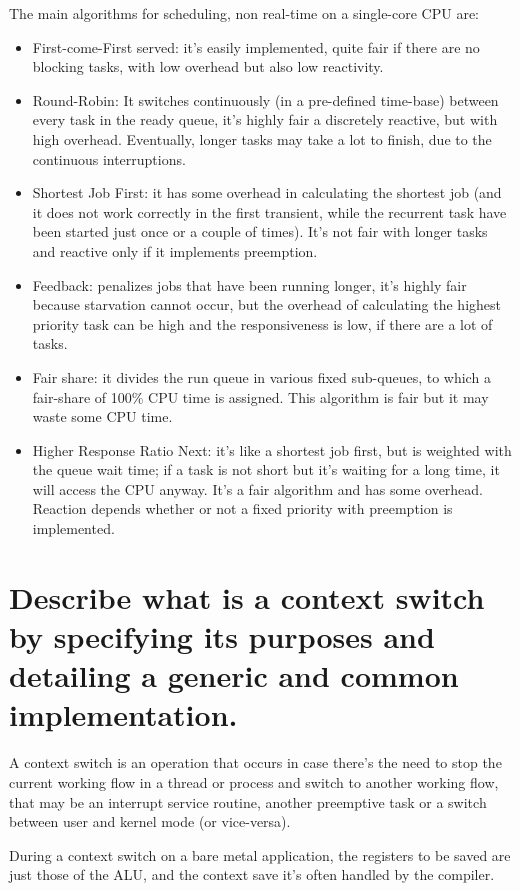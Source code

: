 The main algorithms for scheduling, non real-time on a single-core CPU are:
\begin{itemize}
	\item First-come-First served: it's easily implemented, quite fair if there are no blocking tasks, with low overhead but also low reactivity.
	\item Round-Robin: It switches continuously (in a pre-defined time-base) between every task in the ready queue, it's highly fair a discretely reactive, but with high overhead. Eventually, longer tasks may take a lot to finish, due to the continuous interruptions.
	\item Shortest Job First: it has some overhead in calculating the shortest job (and it does not work correctly in the first transient, while the recurrent task have been started just once or a couple of times). It's not fair with longer tasks and reactive only if it implements preemption.
	\item Feedback: penalizes jobs that have been running longer, it's highly fair because starvation cannot occur, but the overhead of calculating the highest priority task can be high and the responsiveness is low, if there are a lot of tasks.
	\item Fair share: it divides the run queue in various fixed sub-queues, to which a fair-share of 100\% CPU time is assigned. This algorithm is fair but it may waste some CPU time. 
	\item Higher Response Ratio Next: it's like a shortest job first, but is weighted with the queue wait time; if a task is not short but it's waiting for a long time, it will access the CPU anyway. It's a fair algorithm and has some overhead. Reaction depends whether or not a fixed priority with preemption is implemented.
\end{itemize}

\section{Describe what is a context switch by specifying its purposes and detailing a generic and common implementation.}
A context switch is an operation that occurs in case there's the need to stop the current working flow in a thread or process and switch to another working flow, that may be an interrupt service routine, another preemptive task or a switch between user and kernel mode (or vice-versa).

During a context switch on a bare metal application, the registers to be saved are just those of the ALU, and the context save it's often handled by the compiler.

